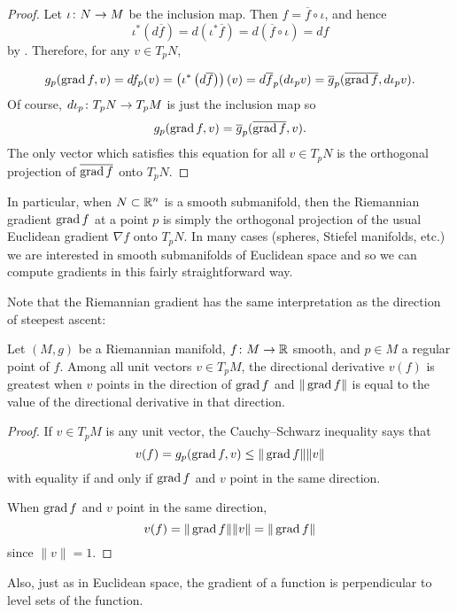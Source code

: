 \begin{proof}
	Let $\iota \colon\thinspace\! N \to M$ be the inclusion map. Then $f = \overline{f} \circ \iota$, and hence
	\[
		\iota^\ast \left(d\overline{f}\right) = d \left(\iota^\ast \overline{f}\right) = d\left(\overline{f} \circ \iota\right) = df
	\]
	by . Therefore, for any $v \in T_pN$,

	\[
		g_p(\operatorname{grad} f, v) = df_p(v) = \left(\iota^\ast\left(d \overline{f}\right)\right)(v) = d\overline{f}_p(d\iota_p v) =\overline{g}_p(\overline{\operatorname{grad} f},d\iota_p v).
	\]
	Of course, $d\iota_p \colon\thinspace\! T_pN \to T_p M$ is just the inclusion map so
	\[
		g_p(\operatorname{grad} f, v) = \overline{g}_p(\overline{\operatorname{grad} f},v).
	\]
	The only vector which satisfies this equation for all $v \in T_pN$ is the orthogonal projection of $\overline{\operatorname{grad} f}$ onto $T_pN$.
\end{proof}

In particular, when $N \subset \mathbb{R}^n$ is a smooth submanifold, then the Riemannian gradient $\operatorname{grad} f$ at a point $p$ is simply the orthogonal projection of the usual Euclidean gradient $\nabla f$ onto $T_pN$. In many cases (spheres, Stiefel manifolds, etc.) we are interested in smooth submanifolds of Euclidean space and so we can compute gradients in this fairly straightforward way.

Note that the Riemannian gradient has the same interpretation as the direction of steepest ascent:

\begin{proposition}\label{prop:gradient steepest ascent}
	Let $(M,g)$ be a Riemannian manifold, $f \colon\thinspace\! M \to \mathbb{R}$ smooth, and $p \in M$ a regular point of $f$. Among all unit vectors $v \in T_pM$, the directional derivative $v(f)$ is greatest when $v$ points in the direction of $\operatorname{grad} f$ and $\|\operatorname{grad} f\|$ is equal to the value of the directional derivative in that direction.
\end{proposition}

\begin{proof}
	If $v \in T_pM$ is any unit vector, the Cauchy–Schwarz inequality says that
	\[
		v(f) = g_p(\operatorname{grad} f, v) \leq \|\operatorname{grad} f\|\|v\|
	\]
	with equality if and only if $\operatorname{grad} f$ and $v$ point in the same direction. 
	
	When $\operatorname{grad} f$ and $v$ point in the same direction,
	\[
		v(f) = \|\operatorname{grad} f\|\|v\| = \|\operatorname{grad} f\|
	\]
	since $\|v\| = 1$.
\end{proof}

Also, just as in Euclidean space, the gradient of a function is perpendicular to level sets of the function.

